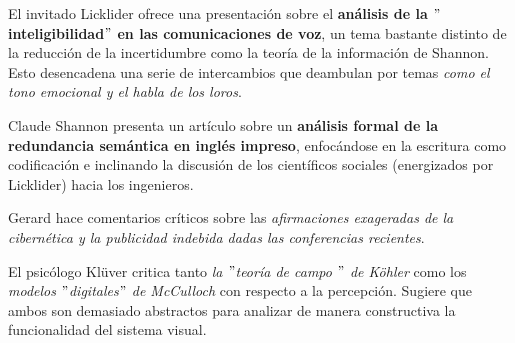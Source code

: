 \documentclass[11pt]{article}
\begin{document}
		El invitado Licklider ofrece una presentación sobre el \textbf{análisis de la $"$inteligibilidad$"$ en las comunicaciones de voz}, un tema bastante distinto de la reducción de la incertidumbre como la teoría de la información de Shannon. Esto desencadena una serie de intercambios que deambulan por temas \textit{como el tono emocional y el habla de los loros}.\par 
		Claude Shannon presenta un artículo sobre un \textbf{análisis formal de la redundancia semántica en inglés impreso}, enfocándose en la escritura como codificación e inclinando la discusión de los científicos sociales (energizados por Licklider) hacia los ingenieros.\par
		Gerard hace comentarios críticos sobre las \textit{afirmaciones exageradas de la cibernética y la publicidad indebida dadas las conferencias recientes}.\par
			El psicólogo Klüver critica tanto\textit{ la $"$teoría de campo $"$ de Köhler} como los \textit{modelos $"$digitales$"$ de McCulloch} con respecto a la percepción. Sugiere que ambos son demasiado abstractos para analizar de manera constructiva la funcionalidad del sistema visual.
\end{document}
